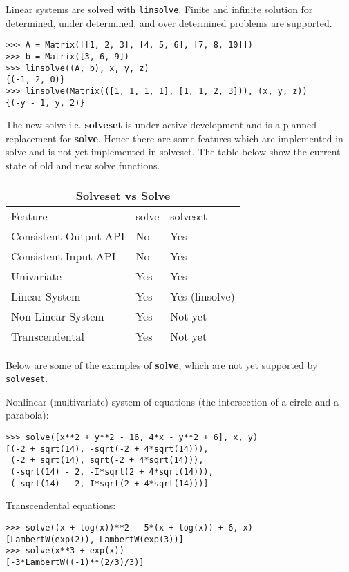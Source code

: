Linear systems are solved with \texttt{linsolve}. Finite and infinite solution for determined, under
determined, and over determined problems are supported.
\begin{verbatim}
>>> A = Matrix([[1, 2, 3], [4, 5, 6], [7, 8, 10]])
>>> b = Matrix([3, 6, 9])
>>> linsolve((A, b), x, y, z)
{(-1, 2, 0)}
>>> linsolve(Matrix(([1, 1, 1, 1], [1, 1, 2, 3])), (x, y, z))
{(-y - 1, y, 2)}
\end{verbatim}

The new solve i.e. \textbf{solveset} is under active development and is a
planned replacement for \textbf{solve}, Hence there are some features which are
implemented in solve and is not yet implemented in solveset. The table below
show the current state of old and new solve functions.

\hfill

\begin{tabular}{ |p{4cm}|p{3cm}|p{3cm}|  }
\hline
\multicolumn{3}{|c|}{Solveset vs Solve} \\
\hline
Feature& solve &solveset \\
\hline
Consistent Output API & No & Yes \\
Consistent Input API & No & Yes \\
Univariate & Yes & Yes\\
Linear System& Yes & Yes (linsolve) \\
Non Linear System& Yes & Not yet \\
Transcendental& Yes & Not yet \\
\hline
\end{tabular}

\hfill \break{}

Below are some of the examples of \textbf{solve}, which are not yet supported
by \texttt{solveset}.

\noindent Nonlinear (multivariate) system of equations (the intersection of a circle
and a parabola):
\begin{verbatim}
>>> solve([x**2 + y**2 - 16, 4*x - y**2 + 6], x, y)
[(-2 + sqrt(14), -sqrt(-2 + 4*sqrt(14))),
 (-2 + sqrt(14), sqrt(-2 + 4*sqrt(14))),
 (-sqrt(14) - 2, -I*sqrt(2 + 4*sqrt(14))),
 (-sqrt(14) - 2, I*sqrt(2 + 4*sqrt(14)))]
\end{verbatim}

\noindent Transcendental equations:
\begin{verbatim}
>>> solve((x + log(x))**2 - 5*(x + log(x)) + 6, x)
[LambertW(exp(2)), LambertW(exp(3))]
>>> solve(x**3 + exp(x))
[-3*LambertW((-1)**(2/3)/3)]
\end{verbatim}
